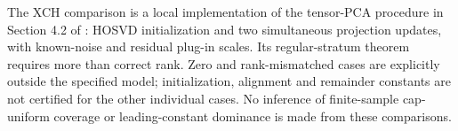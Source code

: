 The XCH comparison is a local implementation of the tensor-PCA procedure in Section 4.2 of \citet{xu2025}: HOSVD initialization and two simultaneous projection updates, with known-noise and residual plug-in scales. Its regular-stratum theorem requires more than correct rank. Zero and rank-mismatched cases are explicitly outside the specified model; initialization, alignment and remainder constants are not certified for the other individual cases. No inference of finite-sample cap-uniform coverage or leading-constant dominance is made from these comparisons.
